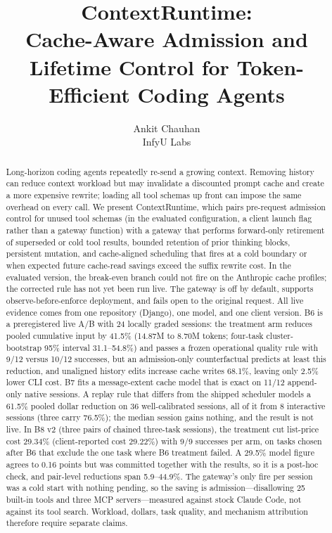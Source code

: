 \documentclass[10pt,twocolumn]{article}
\title{\vspace{-1.2em}\textbf{ContextRuntime:}\\
\Large Cache-Aware Admission and Lifetime Control for Token-Efficient Coding Agents}
\author{Ankit Chauhan\\\small InfyU Labs}
\date{}
\begin{document}
\maketitle
\thispagestyle{fancy}

\begin{abstract}
Long-horizon coding agents repeatedly re-send a growing context.  Removing history can reduce
context workload but may invalidate a discounted prompt cache and create a more expensive rewrite;
loading all tool schemas up front can impose the same overhead on every call.  We present
ContextRuntime, which pairs pre-request admission control for unused tool schemas (in the evaluated
configuration, a client launch flag rather than a gateway function) with a gateway that performs
forward-only retirement of superseded or cold tool results, bounded retention of prior thinking
blocks, persistent mutation, and cache-aligned scheduling that fires at a cold boundary or when
expected future cache-read savings exceed the suffix rewrite cost.  In the evaluated version, the break-even branch
could not fire on the Anthropic cache profiles; the corrected rule has not yet been run live.  The gateway is off by default, supports
observe-before-enforce deployment, and fails open to the original request.  All live evidence comes from
one repository (Django), one model, and one client version.  B6 is a preregistered live A/B with 24
locally graded sessions: the treatment arm reduces pooled cumulative input by 41.5\% (14.87M to 8.70M
tokens; four-task cluster-bootstrap 95\% interval 31.1--54.8\%) and passes a frozen operational
quality rule with 9/12 versus 10/12 successes, but an admission-only counterfactual predicts at least
this reduction, and unaligned history edits increase cache writes 68.1\%, leaving only 2.5\% lower CLI
cost.  B7 fits a message-extent cache model that is exact on 11/12 append-only native sessions.  A
replay rule that differs from the shipped scheduler models a 61.5\% pooled dollar reduction on 36
well-calibrated sessions, all of it from 8 interactive sessions (three carry 76.5\%); the median
session gains nothing, and the result is not live.  In B8 v2 (three pairs of chained three-task
sessions), the treatment cut list-price cost 29.34\% (client-reported cost 29.22\%) with 9/9 successes
per arm, on tasks chosen after B6 that exclude the one task where B6 treatment failed.  A 29.5\% model figure
agrees to 0.16 points but was committed together with the results, so it is a post-hoc check, and
pair-level reductions span 5.9--44.9\%.  The gateway's only fire per session was a cold start with
nothing pending, so the saving is admission---disallowing 25 built-in tools and three MCP
servers---measured against stock Claude Code, not against its tool search.  Workload, dollars, task
quality, and mechanism attribution therefore require separate claims.
\end{abstract}
\end{document}
